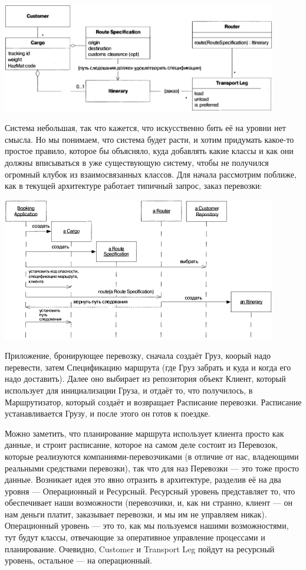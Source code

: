 \documentclass[a5paper]{article}
\begin{document}
\begin{center}
    \includegraphics[width=0.9\textwidth]{cargoNonLayered.png}
\end{center}

Система небольшая, так что кажется, что искусственно бить её на уровни нет смысла. Но мы понимаем, что система будет расти, и хотим придумать какое-то простое правило, которое бы объясняло, куда добавлять какие классы и как они должны вписываться в уже существующую систему, чтобы не получился огромный клубок из взаимосвязанных классов. Для начала рассмотрим поближе, как в текущей архитектуре работает типичный запрос, заказ перевозки:

\begin{center}
    \includegraphics[width=0.9\textwidth]{cargoNonLayeredSequence.png}
\end{center}

Приложение, бронирующее перевозку, сначала создаёт Груз, коорый надо перевести, затем Спецификацию маршрута (где Груз забрать и куда и когда его надо доставить). Далее оно выбирает из репозитория объект Клиент, который использует для инициализации Груза, и отдаёт то, что получилось, в Маршрутизатор, который создаёт и возвращает Расписание перевозки. Расписание устанавливается Грузу, и после этого он готов к поездке.

Можно заметить, что планирование маршрута использует клиента просто как данные, и строит расписание, которое на самом деле состоит из Перевозок, которые реализуются компаниями-перевозчиками (в отличие от нас, владеющими реальными средствами перевозки), так что для наз Перевозки --- это тоже просто данные. Возникает идея это явно отразить в архитектуре, разделив её на два уровня --- Операционный и Ресурсный. Ресурсный уровень представляет то, что обеспечивает наши возможности (перевозчики, и, как ни странно, клиент --- он нам деньги платит, заказывает перевозки, и мы им не управляем никак). Операционный уровень --- это то, как мы пользуемся нашими возможностями, тут будут классы, отвечающие за оперативное управление процессами и планирование. Очевидно, Customer и Transport Leg пойдут на ресурсный уровень, остальное --- на операционный.
\end{document}
